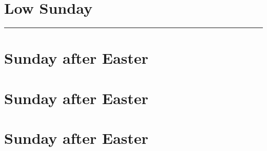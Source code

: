 {{
\section{Low Sunday}
\label{easter1}
\printcommonvespers[1]

\def\commemorations{If the Feast of the Annunciation has been transferred to the Monday following Low Sunday, \emph{First Vespers} is commemorated as on page \pageref{annunciation-commem}.  If today is April 30, May 1, or May 2, \emph{First Vespers of St Joseph the Worker} is commemorated as follows.}
\printcommemnote{}
}

\bigskip
\hrule
\medskip
{
\label{stjoseph-worker-commem}
\def\begincollectcols{\begin{parcolumns}[rulebetween,colwidths={1=0.43\linewidth}]{2}}
\def\vrlinebreak{T}

\bigskip
\benedicamusdomino{}
}

{
\section{ Sunday after Easter}
\label{easter2}
\printcommonvespers{}
\def\precollect{\printvrmanenobiscum}
\def\postmagtitle{\label{easter2-mag}}
\benedicamusdomino{}
}
{
\section{ Sunday after Easter}
\label{easter3}
\printcommonvespers{}
\def\begincollectcols{\begin{parcolumns}[rulebetween,colwidths={1=0.44\linewidth}]{2}}
\def\precollect{\printvrmanenobiscum}
\def\postmagtitle{\label{easter3-mag}}
\benedicamusdomino{}
}

{
\section{ Sunday after Easter}
\label{easter4}
\printcommonvespers{}
\def\precollect{\printvrmanenobiscum}
\def\postmagtitle{\label{easter4-mag}}
\benedicamusdomino{}
}

}
